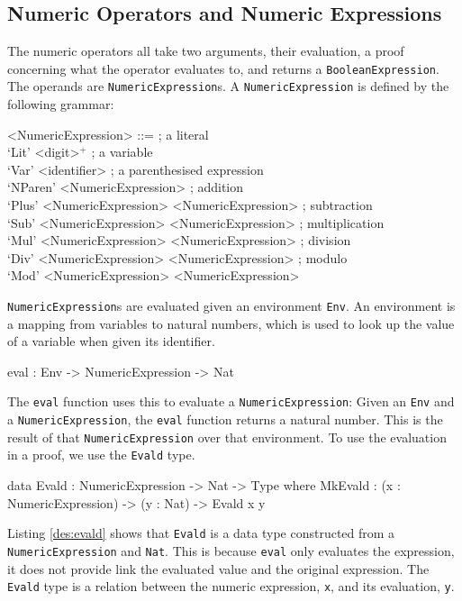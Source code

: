     \subsection{Numeric Operators and Numeric Expressions}
        The numeric operators all take two arguments, their evaluation, a proof concerning what the operator evaluates to, and returns a \texttt{BooleanExpression}.
        The operands are \texttt{NumericExpression}s. A \texttt{NumericExpression} is defined by the following grammar:
        \setlength{\grammarindent}{12em}
        \begin{grammar}
            <NumericExpression>
            ::=  ; a literal\\
                 `Lit' <digit>$^+$
            \alt ; a variable\\
                 `Var' <identifier>
            \alt ; a parenthesised expression\\
                 `NParen' <NumericExpression>
            \alt ; addition\\
                 `Plus' <NumericExpression> <NumericExpression>
            \alt ; subtraction\\
                 `Sub' <NumericExpression> <NumericExpression>
            \alt ; multiplication\\
                 `Mul' <NumericExpression> <NumericExpression>
            \alt ; division\\
                 `Div' <NumericExpression> <NumericExpression>
            \alt ; modulo\\
                 `Mod' <NumericExpression> <NumericExpression>
        \end{grammar}
        \texttt{NumericExpression}s are evaluated given an environment \texttt{Env}. An environment is a mapping from variables to natural numbers, which is used to look up the value of a variable when given its identifier.
        \begin{code}[caption={The type of the \texttt{eval} function}]
            eval : Env -> NumericExpression -> Nat
        \end{code}
        The \texttt{eval} function uses this to evaluate a \texttt{NumericExpression}: Given an \texttt{Env} and a \texttt{NumericExpression}, the \texttt{eval} function returns a natural number. This is the result of that \texttt{NumericExpression} over that environment. To use the evaluation in a proof, we use the \texttt{Evald} type.
        \begin{code}[caption={\texttt{Evald} as defined in the \Idris model},label={des:evald}]
    data Evald : NumericExpression -> Nat -> Type where
        MkEvald : (x : NumericExpression) -> (y : Nat) -> Evald x y
        \end{code}
        Listing \ref{des:evald} shows that \texttt{Evald} is a data type constructed from a \texttt{NumericExpression} and \texttt{Nat}. This  is because \texttt{eval} only evaluates the expression, it does not provide link the evaluated value and the original expression. The \texttt{Evald} type is a relation between the numeric expression, \texttt{x}, and its evaluation, \texttt{y}.
        \\
        
